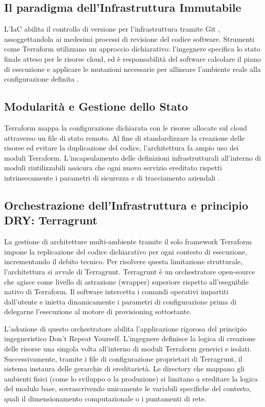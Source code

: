 \subsection{Il paradigma dell'Infrastruttura Immutabile}
L'IaC abilita il controllo di versione per l'infrastruttura tramite Git \cite{Git}, assoggettandola ai medesimi processi di revisione del codice software. Strumenti come Terraform utilizzano un approccio dichiarativo: l'ingegnere specifica lo stato finale atteso per le risorse cloud, ed è responsabilità del software calcolare il piano di esecuzione e applicare le mutazioni necessarie per allineare l'ambiente reale alla configurazione definita \cite{IaCGuerriero}.

\subsection{Modularità e Gestione dello Stato}
Terraform mappa la configurazione dichiarata con le risorse allocate sul cloud attraverso un file di stato remoto. Al fine di standardizzare la creazione delle risorse ed evitare la duplicazione del codice, l'architettura fa ampio uso dei moduli Terraform. L'incapsulamento delle definizioni infrastrutturali all'interno di moduli riutilizzabili assicura che ogni nuovo servizio ereditato rispetti intrinsecamente i parametri di sicurezza e di tracciamento aziendali \cite{TerraformUpAndRunning}.

\subsection{Orchestrazione dell'Infrastruttura e principio DRY: Terragrunt}

La gestione di architetture multi-ambiente tramite il solo framework Terraform impone la replicazione del codice dichiarativo per ogni contesto di esecuzione, incrementando il debito tecnico. Per risolvere questa limitazione strutturale, l'architettura si avvale di Terragrunt. Terragrunt è un orchestratore open-source che agisce come livello di astrazione (wrapper) superiore rispetto all'eseguibile nativo di Terraform. Il software intercetta i comandi operativi impartiti dall'utente e inietta dinamicamente i parametri di configurazione prima di delegarne l'esecuzione al motore di provisioning sottostante.

L'adozione di questo orchestratore abilita l'applicazione rigorosa del principio ingegneristico Don't Repeat Yourself. L'ingegnere definisce la logica di creazione delle risorse una singola volta all'interno di moduli Terraform generici e isolati. Successivamente, tramite i file di configurazione proprietari di Terragrunt, il sistema instaura delle gerarchie di ereditarietà. Le directory che mappano gli ambienti fisici (come lo sviluppo o la produzione) si limitano a ereditare la logica del modulo base, sovrascrivendo unicamente le variabili specifiche del contesto, quali il dimensionamento computazionale o i puntamenti di rete.

